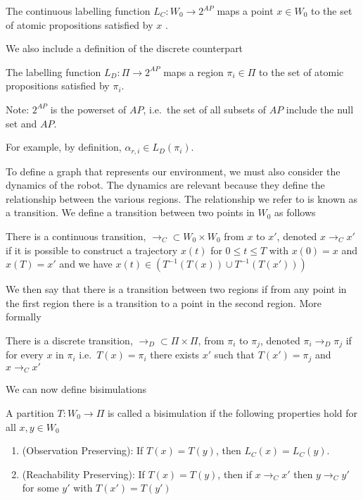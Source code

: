 \theoremstyle{definition}
\begin{definition}
\label{defCLF}
The continuous labelling function $L_C:W_0 \rightarrow 2^{AP}$ maps a point $x \in W_0$ to the set of atomic propositions satisfied by $x$ \cite{guo15}.
\end{definition} 

We also include a definition of the discrete counterpart 

\theoremstyle{definition}
\begin{definition}
\label{defDLF}
The labelling function $L_D:\Pi\rightarrow 2^{AP}$ maps a region $\pi_i \in \Pi$ to the set of atomic propositions satisfied by $\pi_i$.
\end{definition} 
Note: $2^{AP}$ is the powerset of $AP$, i.e.\ the set of all subsets of $AP$ include the null set and $AP$.

For example, by definition, $\alpha_{r,i} \in L_D(\pi_i)$. 

To define a graph that represents our environment, we must also consider the dynamics of the robot. The dynamics are relevant because they define the relationship between the various regions. The relationship we refer to is known as a transition. We define a transition between two points in $W_0$ as follows
\theoremstyle{definition}
\begin{definition}
\label{defCTransition}
There is a continuous transition, $\rightarrow_C \subset W_0 \times W_0$ from $x$ to $x'$, denoted $x \rightarrow_C x'$ if it is possible to construct a trajectory $x(t)$ for $0 \leq t \leq T$ with $x(0)=x$ and $x(T) =x'$ and we have $x(t) \in (T^{-1}(T(x))\cup T^{-1}(T(x')))$ \cite{fainekos09}
\end{definition}

We then say that there is a transition between two regions if from any point in the first region there is a transition to a point in the second region. More formally

\theoremstyle{definition}
\begin{definition}
\label{defDTransition}
There is a discrete transition, $\rightarrow_D \subset \Pi \times \Pi$, from $\pi_i$ to $\pi_j$, denoted $\pi_i \rightarrow_D \pi_j$ if for every $x$ in $\pi_i$ i.e.\ $T(x) = \pi_i$ there exists $x'$ such that $T(x')=\pi_j$ and $x \rightarrow_C x'$
\end{definition}

We can now define bisimulations
\theoremstyle{definition}
\begin{definition}
\label{def:bisim}
A partition $T:W_0\rightarrow \Pi$ is called a bisimulation \cite{fainekos09} if the following properties hold for all $x,y \in W_0$
\begin{enumerate}
    \item (Observation Preserving): If $T(x)=T(y)$, then $L_C(x) = L_C(y)$.
    \item (Reachability Preserving): If $T(x) = T(y)$, then if $x\rightarrow_C x'$ then $y \rightarrow_C y'$ for some $y'$ with $T(x')=T(y')$
\end{enumerate}
\end{definition}

